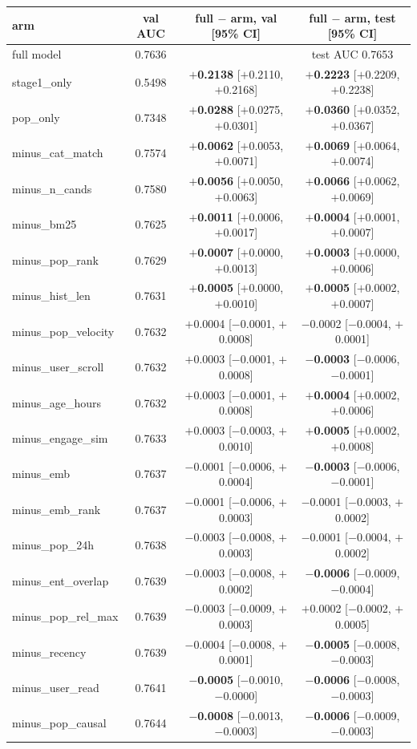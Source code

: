 \begin{tabular}{@{}lccc@{}}
\toprule
arm & val AUC & full $-$ arm, val [95\% CI] & full $-$ arm, test [95\% CI] \\
\midrule
full model & 0.7636 & & test AUC 0.7653 \\
stage1\_only & 0.5498 & \textbf{$+$0.2138} [$+$0.2110, $+$0.2168] & \textbf{$+$0.2223} [$+$0.2209, $+$0.2238] \\
pop\_only & 0.7348 & \textbf{$+$0.0288} [$+$0.0275, $+$0.0301] & \textbf{$+$0.0360} [$+$0.0352, $+$0.0367] \\
minus\_cat\_match & 0.7574 & \textbf{$+$0.0062} [$+$0.0053, $+$0.0071] & \textbf{$+$0.0069} [$+$0.0064, $+$0.0074] \\
minus\_n\_cands & 0.7580 & \textbf{$+$0.0056} [$+$0.0050, $+$0.0063] & \textbf{$+$0.0066} [$+$0.0062, $+$0.0069] \\
minus\_bm25 & 0.7625 & \textbf{$+$0.0011} [$+$0.0006, $+$0.0017] & \textbf{$+$0.0004} [$+$0.0001, $+$0.0007] \\
minus\_pop\_rank & 0.7629 & \textbf{$+$0.0007} [$+$0.0000, $+$0.0013] & \textbf{$+$0.0003} [$+$0.0000, $+$0.0006] \\
minus\_hist\_len & 0.7631 & \textbf{$+$0.0005} [$+$0.0000, $+$0.0010] & \textbf{$+$0.0005} [$+$0.0002, $+$0.0007] \\
minus\_pop\_velocity & 0.7632 & $+$0.0004 [$-$0.0001, $+$0.0008] & $-$0.0002 [$-$0.0004, $+$0.0001] \\
minus\_user\_scroll & 0.7632 & $+$0.0003 [$-$0.0001, $+$0.0008] & \textbf{$-$0.0003} [$-$0.0006, $-$0.0001] \\
minus\_age\_hours & 0.7632 & $+$0.0003 [$-$0.0001, $+$0.0008] & \textbf{$+$0.0004} [$+$0.0002, $+$0.0006] \\
minus\_engage\_sim & 0.7633 & $+$0.0003 [$-$0.0003, $+$0.0010] & \textbf{$+$0.0005} [$+$0.0002, $+$0.0008] \\
minus\_emb & 0.7637 & $-$0.0001 [$-$0.0006, $+$0.0004] & \textbf{$-$0.0003} [$-$0.0006, $-$0.0001] \\
minus\_emb\_rank & 0.7637 & $-$0.0001 [$-$0.0006, $+$0.0003] & $-$0.0001 [$-$0.0003, $+$0.0002] \\
minus\_pop\_24h & 0.7638 & $-$0.0003 [$-$0.0008, $+$0.0003] & $-$0.0001 [$-$0.0004, $+$0.0002] \\
minus\_ent\_overlap & 0.7639 & $-$0.0003 [$-$0.0008, $+$0.0002] & \textbf{$-$0.0006} [$-$0.0009, $-$0.0004] \\
minus\_pop\_rel\_max & 0.7639 & $-$0.0003 [$-$0.0009, $+$0.0003] & $+$0.0002 [$-$0.0002, $+$0.0005] \\
minus\_recency & 0.7639 & $-$0.0004 [$-$0.0008, $+$0.0001] & \textbf{$-$0.0005} [$-$0.0008, $-$0.0003] \\
minus\_user\_read & 0.7641 & \textbf{$-$0.0005} [$-$0.0010, $-$0.0000] & \textbf{$-$0.0006} [$-$0.0008, $-$0.0003] \\
minus\_pop\_causal & 0.7644 & \textbf{$-$0.0008} [$-$0.0013, $-$0.0003] & \textbf{$-$0.0006} [$-$0.0009, $-$0.0003] \\
\bottomrule
\end{tabular}

